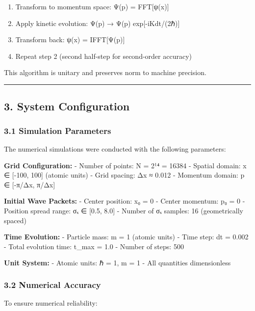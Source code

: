 \documentclass[
]{article}
\providecommand{\tightlist}{%
  \setlength{\itemsep}{0pt}\setlength{\parskip}{0pt}}
\begin{document}
\begin{enumerate}
\def\labelenumi{\arabic{enumi}.}
\tightlist
\item
  Transform to momentum space: Ψ(p) = FFT{[}ψ(x){]}
\item
  Apply kinetic evolution: Ψ(p) → Ψ(p) exp{[}-iKdt/(2ℏ){]}
\item
  Transform back: ψ(x) = IFFT{[}Ψ(p){]}
\item
  Repeat step 2 (second half-step for second-order accuracy)
\end{enumerate}

This algorithm is unitary and preserves norm to machine precision.

\begin{center}\rule{0.5\linewidth}{0.5pt}\end{center}

\subsection{3. System Configuration}\label{system-configuration}

\subsubsection{3.1 Simulation Parameters}\label{simulation-parameters}

The numerical simulations were conducted with the following parameters:

\textbf{Grid Configuration:} - Number of points: N = 2¹⁴ = 16384 -
Spatial domain: x ∈ {[}-100, 100{]} (atomic units) - Grid spacing: Δx ≈
0.012 - Momentum domain: p ∈ {[}-π/Δx, π/Δx{]}

\textbf{Initial Wave Packets:} - Center position: x₀ = 0 - Center
momentum: p₀ = 0 - Position spread range: σₓ ∈ {[}0.5, 8.0{]} - Number
of σₓ samples: 16 (geometrically spaced)

\textbf{Time Evolution:} - Particle mass: m = 1 (atomic units) - Time
step: dt = 0.002 - Total evolution time: t\_max = 1.0 - Number of steps:
500

\textbf{Unit System:} - Atomic units: ℏ = 1, m = 1 - All quantities
dimensionless

\subsubsection{3.2 Numerical Accuracy}\label{numerical-accuracy}

To ensure numerical reliability:
\end{document}

